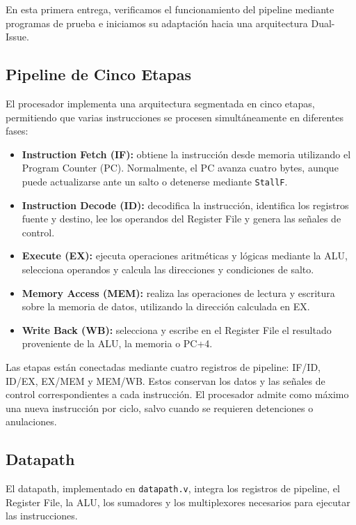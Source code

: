 \documentclass[12pt,a4paper]{article}
\begin{document}
En esta primera entrega, verificamos el funcionamiento del pipeline mediante programas de prueba e iniciamos su adaptación hacia una arquitectura Dual-Issue.

\subsection{Pipeline de Cinco Etapas}

El procesador implementa una arquitectura segmentada en cinco etapas, permitiendo que varias instrucciones se procesen simultáneamente en diferentes fases:

\begin{itemize}
    \item \textbf{Instruction Fetch (IF):} obtiene la instrucción desde memoria utilizando el Program Counter (PC). Normalmente, el PC avanza cuatro bytes, aunque puede actualizarse ante un salto o detenerse mediante \texttt{StallF}.

    \item \textbf{Instruction Decode (ID):} decodifica la instrucción, identifica los registros fuente y destino, lee los operandos del Register File y genera las señales de control.

    \item \textbf{Execute (EX):} ejecuta operaciones aritméticas y lógicas mediante la ALU, selecciona operandos y calcula las direcciones y condiciones de salto.

    \item \textbf{Memory Access (MEM):} realiza las operaciones de lectura y escritura sobre la memoria de datos, utilizando la dirección calculada en EX.

    \item \textbf{Write Back (WB):} selecciona y escribe en el Register File el resultado proveniente de la ALU, la memoria o PC+4.
\end{itemize}

Las etapas están conectadas mediante cuatro registros de pipeline: IF/ID, ID/EX, EX/MEM y MEM/WB. Estos conservan los datos y las señales de control correspondientes a cada instrucción. El procesador admite como máximo una nueva instrucción por ciclo, salvo cuando se requieren detenciones o anulaciones.

\subsection{Datapath}

El datapath, implementado en \texttt{datapath.v}, integra los registros de pipeline, el Register File, la ALU, los sumadores y los multiplexores necesarios para ejecutar las instrucciones.
\end{document}
